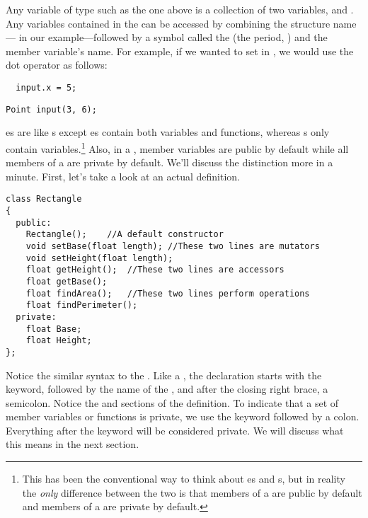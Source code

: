 
Any variable of type  such as the one above is a collection of two variables,  and . 
Any variables contained in the  can be accessed by combining the structure name--- in our example---followed by a symbol called the  (the period, ) and the member variable's name. 
For example, if we wanted to set  in , we would use the dot operator as follows:

\begin{lstlisting}
  input.x = 5;
\end{lstlisting}



\begin{lstlisting}
Point input(3, 6); 
\end{lstlisting}


es are like s except es contain both variables and functions, whereas s only contain variables.\footnote{This has been the conventional way to think about es and s, but in reality the \emph{only} difference between the two is that members of a  are public by default and members of a  are private by default.} 
Also, in a , member variables are public by default while all members of a  are private by default. 
We'll discuss the distinction more in a minute. 
First, let's take a look at an actual  definition.

\begin{lstlisting}
class Rectangle
{
  public: 
    Rectangle();	//A default constructor
    void setBase(float length); //These two lines are mutators
    void setHeight(float length);
    float getHeight();	//These two lines are accessors
    float getBase();	
    float findArea();	//These two lines perform operations
    float findPerimeter();
  private:
    float Base;
    float Height;
};
\end{lstlisting}

Notice the similar syntax to the . 
Like a , the declaration starts with the  keyword, followed by the name of the , and after the closing right brace, a semicolon. 
Notice the  and  sections of the definition. 
To indicate that a set of member variables or functions is private, we use the  keyword followed by a colon. 
Everything after the keyword will be considered private.
We will discuss what this means in the next section.

